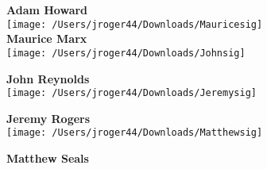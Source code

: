 \documentclass[12pt]{article}
\begin{document}
		\textbf{Adam Howard} \hfill\\
		
		\texttt{[image: /Users/jroger44/Downloads/Mauricesig]} \\
		
		\textbf{Maurice Marx} \\
		
		\texttt{[image: /Users/jroger44/Downloads/Johnsig]}
		
		\textbf{John Reynolds} \\
		
		\texttt{[image: /Users/jroger44/Downloads/Jeremysig]}
		
		\textbf{Jeremy Rogers} \\
		
		\texttt{[image: /Users/jroger44/Downloads/Matthewsig]}
		
		\textbf{Matthew Seals} 
		
	
	
\end{document}
